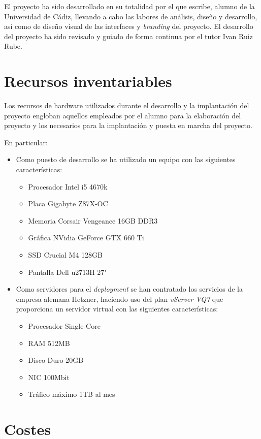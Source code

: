 El proyecto ha sido desarrollado en su totalidad por el que escribe, alumno de
la Universidad de Cádiz, llevando a cabo las labores de análisis, diseño y
desarrollo, así como de diseño visual de las interfaces y \textit{branding} del
proyecto. El desarrollo del proyecto ha sido revisado y guiado de forma continua por el
tutor Ivan Ruiz Rube.

\section{Recursos inventariables}

Los recursos de hardware utilizados durante el desarrollo y la implantación del
proyecto engloban aquellos empleados por el alumno para la elaboración del
proyecto y los necesarios para la implantación y puesta en marcha del proyecto.

En particular:
\begin{itemize}
\item Como puesto de desarrollo se ha utilizado un equipo con las siguientes características:
  \begin{itemize}
  \item Procesador Intel i5 4670k
  \item Placa Gigabyte Z87X-OC
  \item Memoria Corsair Vengeance 16GB DDR3
  \item Gráfica NVidia GeForce GTX 660 Ti
  \item SSD Crucial M4 128GB
  \item Pantalla Dell u2713H 27"
  \end{itemize}

\item Como servidores para el \textit{deployment} se han contratado los
  servicios de la empresa alemana Hetzner, haciendo uso del plan \textit{vServer
    VQ7} que proporciona un servidor virtual con las siguientes características:
  \begin{itemize}
  \item Procesador Single Core
  \item RAM 512MB
  \item Disco Duro 20GB
  \item NIC 100Mbit
  \item Tráfico máximo 1TB al mes
  \end{itemize}

\end{itemize}

\section{Costes}


